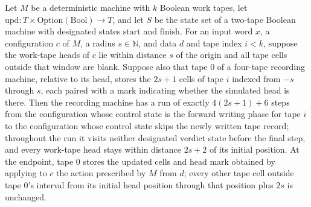 \begin{theorem}
\label{Turing.recordStep_tape_run}
\leanok
{}
Let $M$ be a deterministic machine with $k$ Boolean work tapes, let
$\mathrm{upd}:T\times\mathrm{Option}(\mathrm{Bool})\to T$, and let $S$ be the state set
of a two-tape Boolean machine with designated states $\mathrm{start}$ and
$\mathrm{finish}$. For an input word $x$, a configuration $c$ of $M$, a radius
$s\in\mathbb{N}$, and data $d$ and tape index $i<k$, suppose the work-tape heads of $c$
lie within distance $s$ of the origin and all tape cells outside that window are blank.
Suppose also that tape $0$ of a four-tape recording machine, relative to its head,
stores the $2s+1$ cells of tape $i$ indexed from $-s$ through $s$, each paired with a
mark indicating whether the simulated head is there. Then the recording machine has a
run of exactly $4(2s+1)+6$ steps from the configuration whose control state is the
forward writing phase for tape $i$ to the configuration whose control state skips the
newly written tape record; throughout the run it visits neither designated verdict state
before the final step, and every work-tape head stays within distance $2s+2$ of its
initial position. At the endpoint, tape $0$ stores the updated cells and head mark
obtained by applying to $c$ the action prescribed by $M$ from $d$; every other tape cell
outside tape $0$'s interval from its initial head position through that position plus
$2s$ is unchanged.
\end{theorem}

